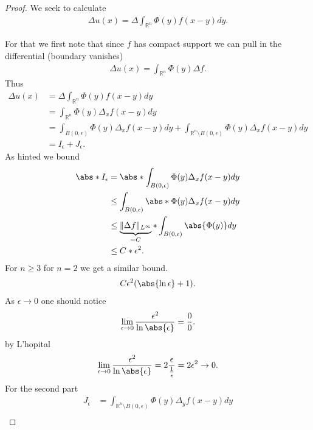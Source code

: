 \begin{proof}
 We seek to calculate 
 \begin{align*}
   \Delta  u(x) = \Delta  \int_{\mathbb{R}^{n} } \Phi(y)  f(x-y)dy
 .\end{align*}
 
 For that we first note that since $f$ has compact support we can pull in the differential (boundary vanishes)
 \begin{align*}
   \Delta u(x) = \int_{\mathbb{R}^{n} } \Phi(y) \Delta  f 
 .\end{align*}
 Thus 
 \begin{align*}
   \Delta  u(x) &= \Delta  \int_{\mathbb{R}^{n} } \Phi(y)  f(x-y)dy\\
                &= \int_{\mathbb{R}^{n} } \Phi(y) \Delta_x f(x-y) dy \\
                &= \int_{B(0,\epsilon)} \Phi(y) \Delta_x f(x-y) dy  + \int_{\mathbb{R}^{n} \setminus B(0,\epsilon)} \Phi(y) \Delta_x f(x-y) dy \\
                &= I_\epsilon + J_\epsilon
 .\end{align*}
  As hinted we bound 
  \begin{align*}
    \abs*{I_\epsilon}  &=  \abs*{\int_{B(0,\epsilon)} \Phi(y) \Delta_x f(x-y) dy } \\
                       &\le \int_{B(0,\epsilon)} \abs*{\Phi(y) \Delta_x f(x-y) }dy \\
                       &\le \underbrace{\| \Delta f\|_{L^{\infty} }}_{= C} * \int_{B(0,\epsilon)} \abs{\Phi(y)} dy \\
                       &\le  C*\epsilon^2
  .\end{align*}
  For $n\ge 3$ for $n=2$ we get a similar bound. 
  \begin{align*}
    C \epsilon ^{2}(\abs{\ln \epsilon} + 1)  
  .\end{align*}
  As $\epsilon \to 0$ one should notice 
  \begin{align*}
    \lim_{\epsilon \to 0} \frac{\epsilon ^2}{\ln \abs{\epsilon}}   =  \frac{0}{0} 
  .\end{align*}
  by L'hopital 
  \begin{align*}
    \lim_{\epsilon \to 0} \frac{\epsilon ^2}{\ln \abs{\epsilon}} =  2 \frac{\epsilon}{\frac{1}{\epsilon}}  = 2 \epsilon ^2 \to  0
  .\end{align*}
  For the second part 
  \begin{align*}
    J_\epsilon &=  \int_{\mathbb{R}^{n} \setminus B(0,\epsilon) } \Phi(y) \Delta_y f(x-y) dy \\

\end{align*}
\end{proof}

